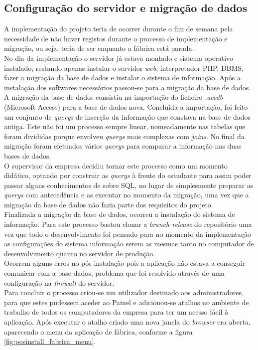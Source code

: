 \subsection{Configuração do servidor e migração de dados}
A implementação do projeto teria de ocorrer durante o fim de semana pela necessidade de não haver registos durante o processo de implementação e migração, ou seja, teria de ser enquanto a fábrica está parada.\\
No dia da implementação o servidor já estava montado e sistema operativo instalado, restando apenas instalar o servidor \textit{web}, interpretador PHP, DBMS, fazer a migração da base de dados e instalar o sistema de informação. Após a instalação dos softwares necessários passou-se para a migração da base de dados. A migração da base de dados consistiu na importação do ficheiro \textit{.accdb} (Microsoft Access) para a base de dados nova. Concluída a importação, foi feito um conjunto de \textit{querys} de inserção da informação que constava na base de dados antiga. Este não foi um processo sempre linear, nomeadamente nas tabelas que foram divididas porque envolveu \textit{querys} mais complexas com \textit{joins}.
No final da migração foram efetuados vários \textit{querys} para comparar a informação nas duas bases de dados.\\
O supervisor da empresa decidiu tornar este processo como um momento didático, optando por construir as \textit{querys} à frente do estudante para assim poder passar alguns conhecimentos de sobre SQL, no lugar de simplesmente preparar as \textit{querys} com antecedência e as executar no momento da migração, uma vez que a migração da base de dados não fazia parte dos requisitos do projeto.\\
Finalizada a migração da base de dados, ocorreu a instalação do sistema de informação. Para este processo bastou clonar a \textit{branch release} do repositório uma vez que todo o desenvolvimento foi pensado para no momento da implementação as configurações do sistema informação serem as mesmas tanto no computador de desenvolvimento quanto no servidor de produção.\\
Ocorrem alguns erros no pós instalação pois a aplicação não estava a conseguir comunicar com a base dados, problema que foi resolvido através de uma configuração na \textit{firewall} do servidor.\\
Para concluir o processo criou-se um utilizador destinado aos administradores, para que estes pudessem aceder ao Painel e adicionou-se atalhos no ambiente de trabalho de todos os computadores da empresa para ter um acesso fácil à aplicação. Após executar o atalho criado uma nova janela do \textit{browser} era aberta, aparecendo o menu da aplicação de fábrica, conforme a figura \ref{fig:posinstall_fabrica_menu}.
